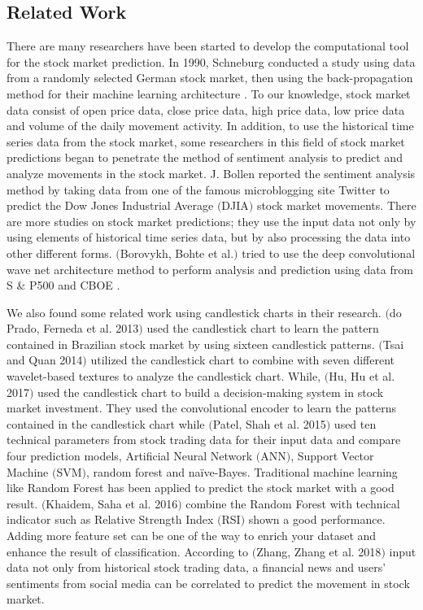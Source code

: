 \documentclass[10pt,twocolumn]{article}
\begin{document}
\subsection{Related Work}
There are many researchers have been started to develop the computational tool for the stock market prediction. In 1990, Schneburg conducted a study using data from a randomly selected German stock market, then using the back-propagation method for their machine learning architecture \cite{schoneburg1990stock}. To our knowledge, stock market data consist of open price data, close price data, high price data, low price data and volume of the daily movement activity. In addition, to use the historical time series data from the stock market, some researchers in this field of stock market predictions began to penetrate the method of sentiment analysis to predict and analyze movements in the stock market. J. Bollen reported the sentiment analysis method by taking data from one of the famous microblogging site Twitter to predict the Dow Jones Industrial Average $($DJIA$)$ stock market movements\cite{bollen2011twitter}. There are more studies on stock market predictions; they use the input data not only by using elements of historical time series data, but by also processing the data into other different forms. $($Borovykh, Bohte et al.$)$ tried to use the deep convolutional wave net architecture method to perform analysis and prediction using data from S \& P500 and CBOE \cite{borovykhdilated}.
\par
We also found some related work using candlestick charts in their research. $($do Prado, Ferneda et al. 2013$)$ used the candlestick chart to learn the pattern contained in Brazilian stock market by using sixteen candlestick patterns\cite{do2013effectiveness}. $($Tsai and Quan 2014$)$ utilized the candlestick chart to combine with seven different wavelet-based textures to analyze the candlestick chart\cite{tsai2014stock}. While,  $($Hu, Hu et al. 2017$)$ used the candlestick chart to build a decision-making system in stock market investment. They used the convolutional encoder to learn the patterns contained in the candlestick chart\cite{hu2017deep} while 
$($Patel, Shah et al. 2015$)$ used ten technical parameters from stock trading data for their input data and compare four prediction models, Artificial Neural Network $($ANN$)$, Support Vector Machine $($SVM$)$, random forest and naïve-Bayes\cite{patel2015predicting}. Traditional machine learning like Random Forest has been applied to predict the stock market with a good result. $($Khaidem, Saha et al. 2016$)$ combine the Random Forest with technical indicator such as Relative Strength Index $($RSI$)$ shown a good performance\cite{khaidem2016predicting}. Adding more feature set can be one of the way to enrich your dataset and enhance the result of classification. According to $($Zhang, Zhang et al. 2018$)$ input data not only from historical stock trading data, a financial news and users’ sentiments from social media can be correlated to predict the movement in stock market\cite{zhang2018improving}.
\end{document}
